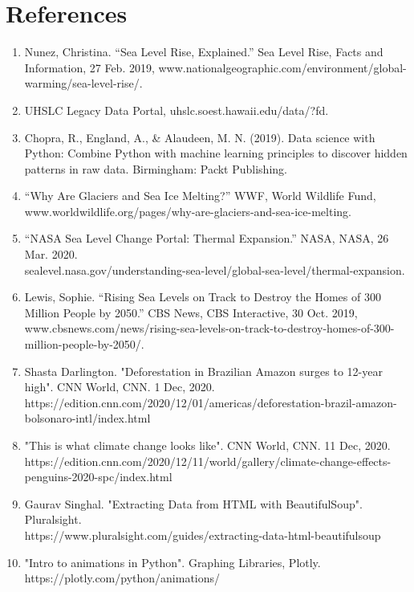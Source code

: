 \documentclass[fontsize=11pt]{article}
\begin{document}
    \section*{References}
    \begin{enumerate}
        \item
        Nunez, Christina. “Sea Level Rise, Explained.” Sea Level Rise, Facts and Information, 27 Feb. 2019, www.nationalgeographic.com/environment/global-warming/sea-level-rise/.
        \item
        UHSLC Legacy Data Portal, uhslc.soest.hawaii.edu/data/?fd.
        \item
        Chopra, R., England, A., \& Alaudeen, M. N. (2019). Data science with Python: Combine Python with machine learning principles to discover hidden patterns in raw data. Birmingham: Packt Publishing.
        \item
        “Why Are Glaciers and Sea Ice Melting?” WWF, World Wildlife Fund, www.worldwildlife.org/pages/why-are-glaciers-and-sea-ice-melting.
        \item
        “NASA Sea Level Change Portal: Thermal Expansion.” NASA, NASA, 26 Mar. 2020.\\ sealevel.nasa.gov/understanding-sea-level/global-sea-level/thermal-expansion.
        \item
        Lewis, Sophie. “Rising Sea Levels on Track to Destroy the Homes of 300 Million People by 2050.” CBS News, CBS Interactive, 30 Oct. 2019, www.cbsnews.com/news/rising-sea-levels-on-track-to-destroy-homes-of-300-million-people-by-2050/.
        \item
        Shasta Darlington. "Deforestation in Brazilian Amazon surges to 12-year high". CNN World, CNN. 1 Dec, 2020.\\ https://edition.cnn.com/2020/12/01/americas/deforestation-brazil-amazon-bolsonaro-intl/index.html
        \item
        "This is what climate change looks like". CNN World, CNN. 11 Dec, 2020.\\
        https://edition.cnn.com/2020/12/11/world/gallery/climate-change-effects-penguins-2020-spc/index.html
        \item
        Gaurav Singhal. "Extracting Data from HTML with BeautifulSoup". Pluralsight.\\ https://www.pluralsight.com/guides/extracting-data-html-beautifulsoup
        \item
        "Intro to animations in Python". Graphing Libraries, Plotly. https://plotly.com/python/animations/

\end{enumerate}
\end{document}
